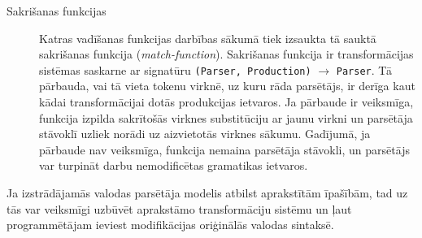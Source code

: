 \begin{description}
\item[Sakrišanas funkcijas]
Katras vadīšanas funkcijas darbības sākumā tiek izsaukta tā sauktā sakrišanas funkcija (\emph{match-function}). Sakrišanas funkcija ir transformācijas sistēmas saskarne ar signatūru \verb|(Parser, Production)| $\to$ \verb|Parser|. Tā pārbauda, vai tā vieta tokenu virknē, uz kuru rāda parsētājs, ir derīga kaut kādai transformācijai dotās produkcijas ietvaros. Ja pārbaude ir veiksmīga, funkcija izpilda sakrītošās virknes substitūciju ar jaunu virkni un parsētāja stāvoklī uzliek norādi uz aizvietotās virknes sākumu. Gadījumā,  ja pārbaude nav veiksmīga, funkcija nemaina parsētāja stāvokli, un parsētājs var turpināt darbu nemodificētas gramatikas ietvaros.
\end{description}

Ja izstrādājamās valodas parsētāja modelis atbilst aprakstītām īpašībām, tad uz tās var veiksmīgi uzbūvēt aprakstāmo transformāciju sistēmu un ļaut programmētājam ieviest modifikācijas oriģinālās valodas sintaksē.